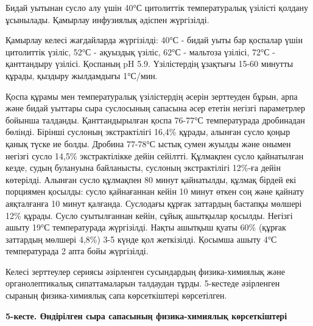 Бидай уытынан сусло алу үшін 40°С цитолиттік температуралық үзілісті
қолдану ұсынылады. Қамырлау инфузиялық әдіспен жүргізілді.

Қамырлау келесі жағдайларда жүргізілді: 40°С - бидай уыты бар қоспалар
үшін цитолиттік үзіліс, 52°С - ақуыздық үзіліс, 62°С - мальтоза үзілісі,
72°С - қанттандыру үзілісі. Қоспаның pH 5.9. Үзілістердің ұзақтығы 15-60
минутты құрады, қыздыру жылдамдығы 1°С/мин.

Қоспа құрамы мен температуралық үзілістердің әсерін зерттеуден бұрын,
арпа және бидай уыттары сыра суслосының сапасына әсер ететін негізгі
параметрлер бойынша талданды. Қанттандырылған қоспа 76-77°С
температурада дробинадан бөлінді. Бірінші суслоның экстрактілігі 16,4\%
құрады, алынған сусло қоңыр қанық түске ие болды. Дробина 77-78°С ыстық
сумен жуылды және онымен негізгі сусло 14,5\% экстрактілікке дейін
сейілтті. Құлмақпен сусло қайнатылған кезде, судың булануына байланысты,
суслоның экстрактілігі 12\%-ға дейін көтерілді. Алынған сусло құлмақпен
80 минут қайнатылды, құлмақ бірдей екі порциямен қосылды: сусло
қайнағаннан кейін 10 минут өткен соң және қайнату аяқталғанға 10 минут
қалғанда. Суслодағы құрғак заттардың бастапқы мөлшері 12\% құрады. Сусло
суытылғаннан кейін, сұйық ашытқылар қосылды. Негізгі ашыту 19°С
температурада жүргізілді. Нақты ашытқыш қуаты 60\% (құрғак заттардың
мөлшері 4,8\%) 3-5 күнде қол жеткізілді. Қосымша ашыту 4°С температурада
2 апта бойы жүргізілді.

Келесі зерттеулер сериясы әзірленген сусындардың физика-химиялық және
органолептикалық сипаттамаларын талдаудан тұрды. 5-кестеде әзірленген
сыраның физика-химиялық сапа көрсеткіштері көрсетілген.

{\bfseries 5-кесте. Өндірілген сыра сапасының физика-химиялық
көрсеткіштері}

